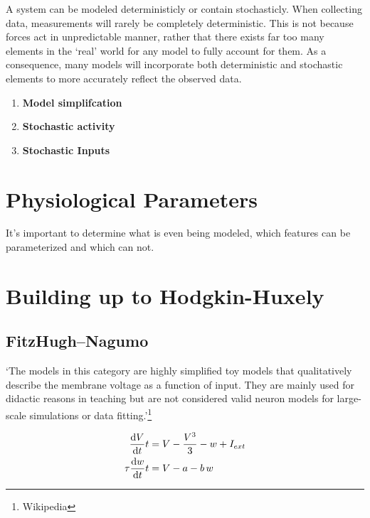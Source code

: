 \documentclass[../../Orator.tex]{subfiles}
\begin{document}
A system can be modeled deterministicly or contain stochasticly. When collecting data, measurements will rarely be completely deterministic. This is not because forces act in unpredictable manner, rather that there exists far too many elements in the `real' world for any model to fully account for them. 
As a consequence, many models will incorporate both deterministic and stochastic elements to more accurately reflect the observed data.
\begin{enumerate}
    \item \textbf{Model simplifcation}
    \item \textbf{Stochastic activity}
    \item \textbf{Stochastic Inputs}
\end{enumerate}



\newpage
\section{Physiological Parameters}
It's important to determine what is even being modeled, which features can be parameterized and which can not.


\newpage
\section{Building up to Hodgkin-Huxely}

\subsection{FitzHugh–Nagumo}
`The models in this category are highly simplified toy models that qualitatively describe the membrane voltage as a function of input. They are mainly used for didactic reasons in teaching but are not considered valid neuron models for large-scale simulations or data fitting.'\footnote{Wikipedia}

\begin{subequations} \label{eq:FitNagSys}
    \begin{align}
        \ode{V}{t} &= V - \frac{V^3}{3} - w + I_{ext} \\ 
        \tau\ode{w}{t} &= V - a - b\,w 
    \end{align}
\end{subequations}
\end{document}
